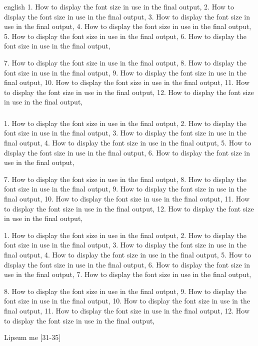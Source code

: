 \begin{otherlanguage*}{english}
1. How to display the font size in use in the final output,
2. How to display the font size in use in the final output,
3. How to display the font size in use in the final output,
4. How to display the font size in use in the final output,
5. How to display the font size in use in the final output,
6. How to display the font size in use in the final output,

7. How to display the font size in use in the final output,
8. How to display the font size in use in the final output,
9. How to display the font size in use in the final output,
10. How to display the font size in use in the final output,
11. How to display the font size in use in the final output,
12. How to display the font size in use in the final output,

\subsubsection{\englishword{\showfont}}

1. How to display the font size in use in the final output,
2. How to display the font size in use in the final output,
3. How to display the font size in use in the final output,
4. How to display the font size in use in the final output,
5. How to display the font size in use in the final output,
6. How to display the font size in use in the final output,

7. How to display the font size in use in the final output,
8. How to display the font size in use in the final output,
9. How to display the font size in use in the final output,
10. How to display the font size in use in the final output,
11. How to display the font size in use in the final output,
12. How to display the font size in use in the final output,

\subsubsubsection{\englishword{\showfont}}

1. How to display the font size in use in the final output,
2. How to display the font size in use in the final output,
3. How to display the font size in use in the final output,
4. How to display the font size in use in the final output,
5. How to display the font size in use in the final output,
6. How to display the font size in use in the final output,
7. How to display the font size in use in the final output,

8. How to display the font size in use in the final output,
9. How to display the font size in use in the final output,
10. How to display the font size in use in the final output,
11. How to display the font size in use in the final output,
12. How to display the font size in use in the final output,


Lipsum me [31-35]

\end{otherlanguage*}


